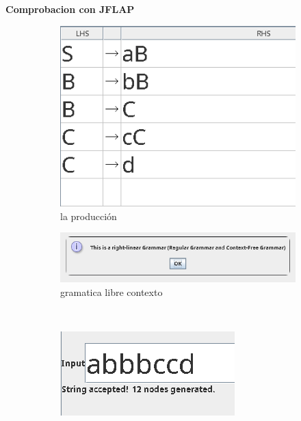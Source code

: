 \documentclass{article}
\begin{document}
        \vspace{\baselineskip} %
        \textbf{Comprobacion con JFLAP}
            \begin{figure}[!h] 
            \centering
                \centering
                \begin{subfigure}[b]{0.35\textwidth}
                    \centering
                    \includegraphics[width=\textwidth]{./Imagenes/image8.png}
                    \caption{la producción}
                    \label{fig:label1}
                \end{subfigure}
                \hfill
                \begin{subfigure}[b]{0.55\textwidth}
                    \centering
                    \includegraphics[width=\textwidth]{./Imagenes/image5.png}
                    \caption{gramatica libre contexto}
                    \label{fig:label2}
                \end{subfigure}
                \vspace{0.5cm} 
                \\
                \begin{subfigure}[b]{0.25\textwidth}
                    \centering
                    \includegraphics[width=\textwidth]{./Imagenes/image7.png}

\end{subfigure}
\end{figure}
\end{document}
